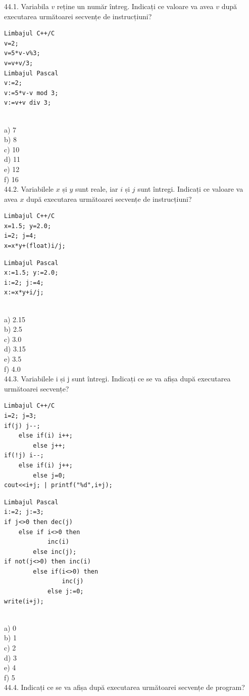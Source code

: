 \begin{itemize}
\begin{enumerate}
44.1. Variabila $v$ reține un număr întreg. Indicați ce valoare va avea $v$ după executarea următoarei secvențe de instrucțiuni?
\begin{verbatim}
Limbajul C++/C
v=2;
v=5*v-v%3;
v=v+v/3;
Limbajul Pascal
v:=2;
v:=5*v-v mod 3;
v:=v+v div 3;
\end{verbatim}
\\
a) 7
\\
b) 8
\\
c) 10
\\
d) 11
\\
e) 12
\\
f) 16
\\
44.2. Variabilele $x$ și $y$ sunt reale, iar $i$ și $j$ sunt întregi. Indicați ce valoare va avea $x$ după executarea următoarei secvențe de instrucțiuni?
\begin{verbatim}
Limbajul C++/C
x=1.5; y=2.0;
i=2; j=4;
x=x*y+(float)i/j;
\end{verbatim}
\begin{verbatim}
Limbajul Pascal
x:=1.5; y:=2.0;
i:=2; j:=4;
x:=x*y+i/j;
\end{verbatim}
\\
a) 2.15
\\
b) 2.5
\\
c) 3.0
\\
d) 3.15
\\
e) 3.5
\\
f) 4.0
\\
44.3. Variabilele i și j sunt întregi. Indicați ce se va afișa după executarea următoarei secvențe?
\begin{verbatim}
Limbajul C++/C
i=2; j=3;
if(j) j--;
    else if(i) i++;
        else j++;
if(!j) i--;
    else if(i) j++;
        else j=0;
cout<<i+j; | printf("%d",i+j);
\end{verbatim}
\begin{verbatim}
Limbajul Pascal
i:=2; j:=3;
if j<>0 then dec(j)
    else if i<>0 then
            inc(i)
        else inc(j);
if not(j<>0) then inc(i)
        else if(i<>0) then
                inc(j)
            else j:=0;
write(i+j);
\end{verbatim}
\\
a) 0
\\
b) 1
\\
c) 2
\\
d) 3
\\
e) 4
\\
f) 5
\\
44.4. Indicați ce se va afișa după executarea următoarei secvențe de program?

\end{enumerate}
\end{itemize}
